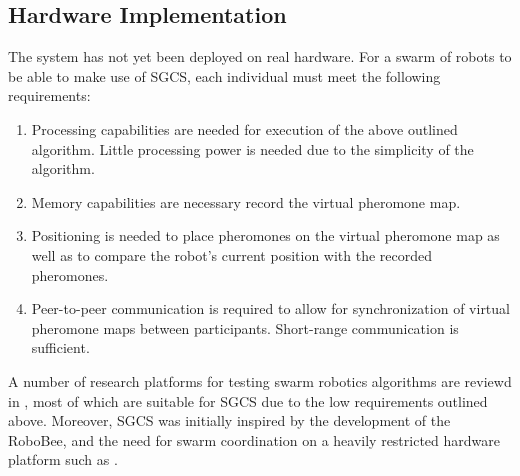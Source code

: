 \subsection{Hardware Implementation}
The system has not yet been deployed on real hardware. For a swarm of robots to be able to make use of SGCS, each individual must meet the following requirements:
\begin{enumerate}
	\item Processing capabilities are needed for execution of the above outlined algorithm. Little processing power is needed due to the simplicity of the algorithm. 
	\item Memory capabilities are necessary record the virtual pheromone map.
	\item Positioning is needed to place pheromones on the virtual pheromone map as well as to compare the robot's current position with the recorded pheromones.
	\item Peer-to-peer communication is required to allow for synchronization of virtual pheromone maps between participants. Short-range communication is sufficient.
\end{enumerate}
\par A number of research platforms for testing swarm robotics algorithms are reviewd in \parencite{schranz_swarm_2020}, most of which are suitable for SGCS due to the low requirements outlined above. Moreover, SGCS was initially inspired by the development of the RoboBee, and the need for swarm coordination on a heavily restricted hardware platform such as \parencite{chen_controlled_2019}.
